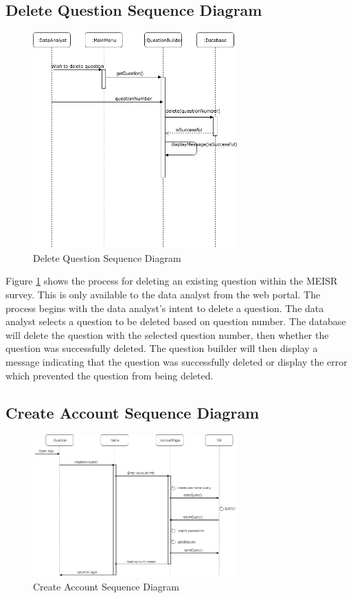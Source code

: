 \subsection{Delete Question Sequence Diagram}
\begin{figure}[H]
  \centering
  \includegraphics[width=0.7\textwidth]{images/DeleteQuestionSequenceDiagram.png}
  \caption{Delete Question Sequence Diagram}
  \label{fig:deleteQuestionSD}
\end{figure}

	Figure \ref{fig:deleteQuestionSD} shows the process for deleting an existing question within the MEISR survey. This is only available to the data analyst from the web portal. The process begins with the data analyst's intent to delete a question. The data analyst selects a question to be deleted based on question number. The database will delete the question with the selected question number, then whether the question was successfully deleted. The question builder will then display a message indicating that the question was successfully deleted or display the error which prevented the question from being deleted.

\subsection{Create Account Sequence Diagram}
\begin{figure}[H]
  \centering
  \includegraphics[width=0.7\textwidth]{images/createAccountSequenceDiagram.png}
  \caption{Create Account Sequence Diagram}
  \label{fig:createAccountSD}
\end{figure}

